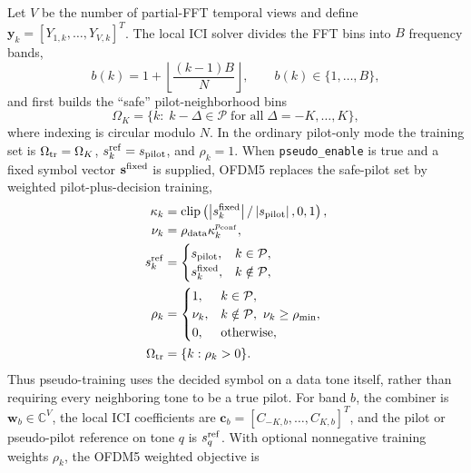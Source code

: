 \documentclass[journal]{IEEEtran}
\newcommand{\C}{\mathbb{C}}
\newcommand{\abs}[1]{\left\lvert #1 \right\rvert}
\begin{document}
Let \(V\) be the number of partial-FFT temporal views and define
\(\mathbf y_k=[Y_{1,k},\ldots,Y_{V,k}]^T\). The local ICI solver divides the
FFT bins into \(B\) frequency bands,
\begin{equation}
  b(k)=1+\left\lfloor \frac{(k-1)B}{N}\right\rfloor,
  \qquad b(k)\in\{1,\ldots,B\},
  \label{eq:ofdm5-band-index}
\end{equation}
and first builds the ``safe'' pilot-neighborhood bins
\begin{equation}
  \Omega_K=\{k:\; k-\Delta \in \mathcal P
      \;\text{for all}\; \Delta=-K,\ldots,K\},
  \label{eq:ofdm5-safe-pilots}
\end{equation}
where indexing is circular modulo \(N\). In the ordinary pilot-only mode the
training set is \(\Omega_{\rm tr}=\Omega_K\), \(s_k^{\rm ref}=s_{\rm pilot}\),
and \(\rho_k=1\). When \texttt{pseudo\_enable} is true and a fixed symbol vector
\(\mathbf s^{\rm fixed}\) is supplied, OFDM5 replaces the safe-pilot set by
weighted pilot-plus-decision training,
\begin{equation}
\begin{aligned}
  \kappa_k&=\operatorname{clip}
      \left(\abs{s_k^{\rm fixed}}/\abs{s_{\rm pilot}},0,1\right),\\
  \nu_k&=\rho_{\rm data}\kappa_k^{p_{\rm conf}},\\
  s_k^{\rm ref} &=
  \begin{cases}
    s_{\rm pilot}, & k\in\mathcal P,\\
    s_k^{\rm fixed}, & k\notin\mathcal P,
  \end{cases}\\
  \rho_k &=
  \begin{cases}
    1, & k\in\mathcal P,\\
    \nu_k, & k\notin\mathcal P,\ \nu_k\ge\rho_{\min},\\
    0, & \text{otherwise},
  \end{cases}\\
  \Omega_{\rm tr}&=\{k:\rho_k>0\}.
\end{aligned}
  \label{eq:ofdm5-pseudo-training}
\end{equation}
Thus pseudo-training uses the decided symbol on a data tone itself, rather than
requiring every neighboring tone to be a true pilot. For band \(b\), the combiner is
\(\mathbf w_b\in\C^V\), the local ICI coefficients are
\(\mathbf c_b=[C_{-K,b},\ldots,C_{K,b}]^T\), and the pilot or pseudo-pilot
reference on tone \(q\) is \(s_q^{\rm ref}\). With optional nonnegative training
weights \(\rho_k\), the OFDM5 weighted objective is
\end{document}
